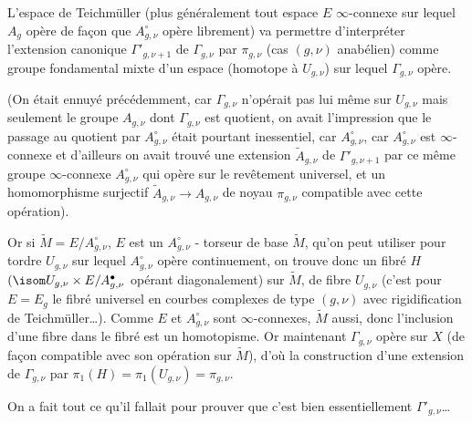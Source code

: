 L'espace de Teichmüller (plus généralement tout espace $E$ $\infty$-connexe sur lequel $A_g$ opère de fa\c{c}on que $A^\circ_{g, \nu}$ opère librement) va permettre d'interpréter l'extension canonique $\Gamma'_{g, \nu + 1}$ de $\Gamma_{g, \nu}$ par $\pi_{g, \nu}$ (cas $(g, \nu)$ anabélien) comme groupe fondamental mixte d'un espace (homotope à $U_{g, \nu}$) sur lequel $\Gamma_{g, \nu}$ opère.

(On était ennuyé précédemment, car $\Gamma_{g, \nu}$ n'opérait pas lui même sur $U_{g, \nu}$ mais seulement le groupe $A_{g, \nu}$ dont $\Gamma_{g, \nu}$ est quotient, on avait l'impression que le passage au quotient par $A^\circ_{g, \nu}$ était pourtant inessentiel, car $A^\circ_{g, \nu}$, car $A^\circ_{g, \nu}$ est $\infty$-connexe et d'ailleurs on avait trouvé une extension $\widetilde{A}_{g, \nu}$ de $\Gamma'_{g, \nu + 1}$ par ce même groupe $\infty$-connexe $A^\circ_{g, \nu}$ qui opère sur le revêtement universel, et un homomorphisme surjectif $\widetilde{A}_{g, \nu} \to A_{g, \nu}$ de noyau $\pi_{g, \nu}$ compatible avec cette opération).

Or si $\widetilde{M} = E/A^\circ_{g, \nu}$, $E$ est un $A^\circ_{g, \nu}$ - torseur de base $\widetilde{M}$, qu'on peut utiliser pour tordre $U_{g, \nu}$ sur lequel $A^\circ_{g, \nu}$ opère continuement, on trouve donc un fibré $H$ $(\isom U_{g, \nu} \times E/A^\bullet_{g, \nu}$ opérant diagonalement) sur $\widetilde{M}$, de fibre $U_{g, \nu}$ (c'est pour $E = E_g$ le fibré universel en courbes complexes de type $(g, \nu)$ avec rigidification de Teichmüller\dots). Comme $E$ et $A^\circ_{g, \nu}$ sont $\infty$-connexes, $\widetilde{M}$ aussi, donc l'inclusion d'une fibre dans le fibré est un homotopisme. Or maintenant $\Gamma_{g, \nu}$ opère sur $X$ (de fa\c{c}on compatible avec son opération sur $\widetilde{M}$), d'où la construction d'une extension de $\Gamma_{g, \nu}$ par $\pi_1(H) = \pi_1(U_{g, \nu}) = \pi_{g, \nu}$.

On a fait tout ce qu'il fallait pour prouver que c'est bien essentiellement $\Gamma'_{g, \nu}$\dots


